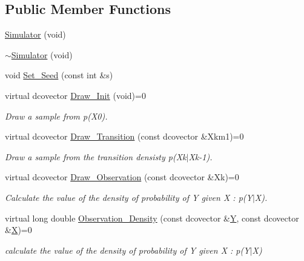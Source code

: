 \subsection*{Public Member Functions}
\begin{CompactItemize}
\item 
\hyperlink{class_simulator_62ab66763cb9e6cccbe88d45ab55547f}{Simulator} (void)
\item 
\hyperlink{class_simulator_39483d076c375dcf4cb826d828abd530}{$\sim$Simulator} (void)
\item 
void \hyperlink{class_simulator_e754c135109204307e1fe08f13d8bcf6}{Set\_\-Seed} (const int \&s)
\item 
virtual dcovector \hyperlink{class_simulator_29b9603eb2be9139972816329e8663dc}{Draw\_\-Init} (void)=0
\begin{CompactList}\small\item\em Draw a sample from p(X0). \item\end{CompactList}\item 
virtual dcovector \hyperlink{class_simulator_45790421a1c2f597739d3e972ad28292}{Draw\_\-Transition} (const dcovector \&Xkm1)=0
\begin{CompactList}\small\item\em Draw a sample from the transition densisty p(Xk$|$Xk-1). \item\end{CompactList}\item 
virtual dcovector \hyperlink{class_simulator_2fb966c2c2a4c93bb6788e15563c9006}{Draw\_\-Observation} (const dcovector \&Xk)=0
\begin{CompactList}\small\item\em Calculate the value of the density of probability of Y given X : p(Y$|$X). \item\end{CompactList}\item 
virtual long double \hyperlink{class_simulator_75b0dfb5b0b88346ecb9f7da4fbd91f1}{Observation\_\-Density} (const dcovector \&\hyperlink{class_simulator_403a127c909abf3e4c6d48a287315987}{Y}, const dcovector \&\hyperlink{class_simulator_a2db8ace19099d996be516022d230bc0}{X})=0
\begin{CompactList}\small\item\em calculate the value of the density of probability of Y given X : p(Y$|$X) \item\end{CompactList}\item 

\end{CompactItemize}
